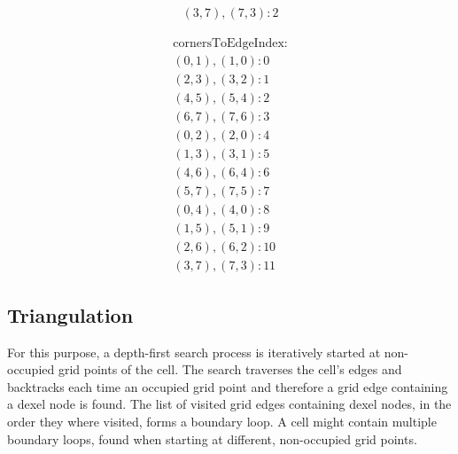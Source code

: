 \begin{figure}
\begin{subfigure}[t]{0.24\textwidth}
\begin{align*}
		(3, 7), (7, 3): 2
		\end{align*}
	\end{subfigure}
	\begin{subfigure}[t]{0.24\textwidth}
		\begin{align*}
		\text{cornersToEdgeIndex:} \\
		(0, 1), (1, 0):  0 \\
		(2, 3), (3, 2):  1 \\
		(4, 5), (5, 4):  2 \\
		(6, 7), (7, 6):  3 \\
		(0, 2), (2, 0):  4 \\
		(1, 3), (3, 1):  5 \\
		(4, 6), (6, 4):  6 \\
		(5, 7), (7, 5):  7 \\
		(0, 4), (4, 0):  8 \\
		(1, 5), (5, 1):  9 \\
		(2, 6), (6, 2): 10 \\
		(3, 7), (7, 3): 11
		\end{align*}
	\end{subfigure}
\end{figure}

\subsection{Triangulation}
\label{sec:tri_dexel_triangulation}

For this purpose, a depth-first search process is iteratively started at non-occupied grid points of the cell.
The search traverses the cell's edges and backtracks each time an occupied grid point and therefore a grid edge containing a dexel node is found.
The list of visited grid edges containing dexel nodes, in the order they where visited, forms a boundary loop.
A cell might contain multiple boundary loops, found when starting at different, non-occupied grid points.

